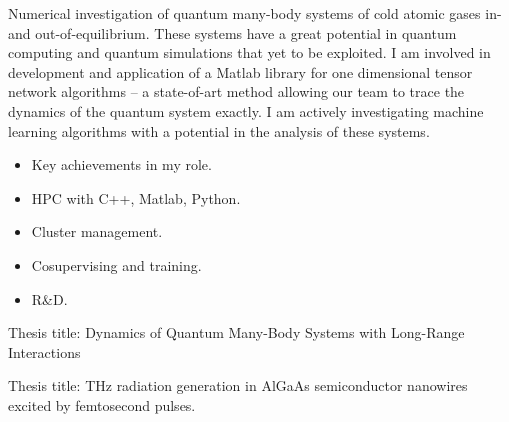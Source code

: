 \documentclass[10pt,a4paper,ragged2e,withhyper]{altacv}
\begin{document}
\begin{paracol}{2}
\begin{itemize}
\end{itemize}



Numerical investigation of quantum many-body systems of cold atomic gases in- and out-of-equilibrium.
These systems have a great potential in quantum computing and quantum simulations that yet to be exploited.
I am involved in development and application of a Matlab library for one dimensional tensor network
algorithms – a state-of-art method allowing our team to trace the dynamics of the quantum system exactly.
I am actively investigating machine learning algorithms with a potential in the analysis of these systems.

\begin{itemize}
    \item Key achievements in my role.
    \item HPC with C++, Matlab, Python.
    \item Cluster management.
    \item Cosupervising and training.
    \item R\&D.
\end{itemize}


Thesis title: Dynamics of Quantum Many-Body Systems with Long-Range Interactions

\divider


\divider

Thesis title: THz radiation generation in AlGaAs semiconductor nanowires excited by femtosecond pulses.







\end{paracol}
\end{document}
